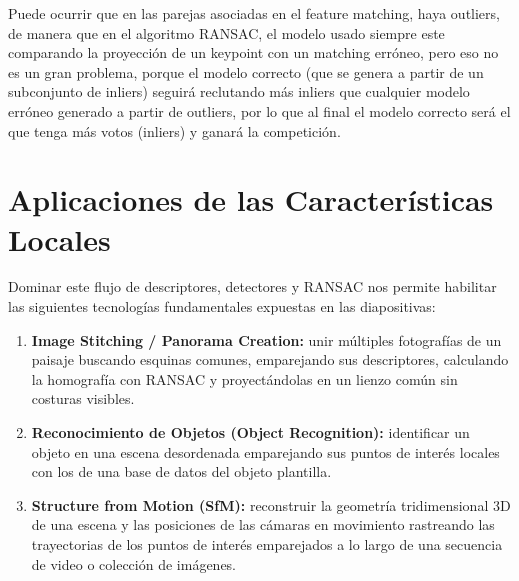 \begin{observacion}
    Puede ocurrir que en las parejas asociadas en el feature matching, haya outliers, de manera que en el algoritmo RANSAC, el modelo usado siempre este comparando la proyección de un keypoint con un matching erróneo, pero eso no es un gran problema, porque el modelo correcto (que se genera a partir de un subconjunto de inliers) seguirá reclutando más inliers que cualquier modelo erróneo generado a partir de outliers, por lo que al final el modelo correcto será el que tenga más votos (inliers) y ganará la competición.\\
\end{observacion}

\section{Aplicaciones de las Características Locales}
Dominar este flujo de descriptores, detectores y RANSAC nos permite habilitar las siguientes tecnologías fundamentales expuestas en las diapositivas:
\begin{enumerate}
    \item \textbf{Image Stitching / Panorama Creation:} unir múltiples fotografías de un paisaje buscando esquinas comunes, emparejando sus descriptores, calculando la homografía con RANSAC y proyectándolas en un lienzo común sin costuras visibles.
    \item \textbf{Reconocimiento de Objetos (Object Recognition):} identificar un objeto en una escena desordenada emparejando sus puntos de interés locales con los de una base de datos del objeto plantilla.
    \item \textbf{Structure from Motion (SfM):} reconstruir la geometría tridimensional 3D de una escena y las posiciones de las cámaras en movimiento rastreando las trayectorias de los puntos de interés emparejados a lo largo de una secuencia de video o colección de imágenes.
\end{enumerate}

